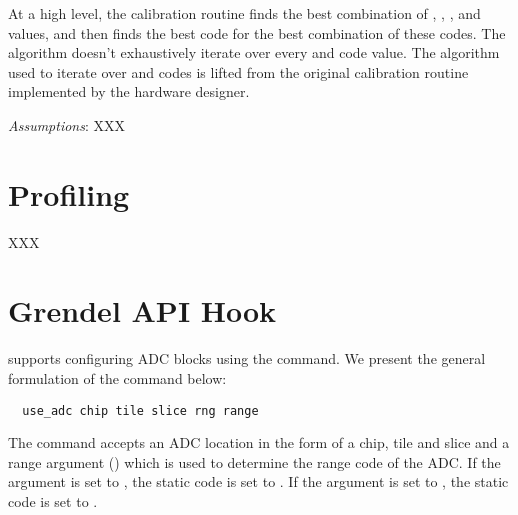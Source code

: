\begin{algorithmic}
        \EndFor
      \EndFor
    \EndFor
    \EndFor
    \EndFor
  \EndFor
  \State{}
  \EndFor
  \State{}
\end{algorithmic}

At a high level, the calibration routine finds the best combination of
, , ,  and  values, and
then finds the best  code for the best combination of these codes.
The algorithm doesn't exhaustively iterate over every  and 
code value. The algorithm used to iterate over  and  codes
is lifted from the original calibration routine implemented by the hardware
designer.

\noindent\textit{Assumptions}: XXX

\section{Profiling}

XXX

\section{Grendel API Hook}

\grendel supports configuring ADC blocks using the  command. We
present the general formulation of the  command below:

\begin{lstlisting}
  use_adc chip tile slice rng range
\end{lstlisting}

The  command accepts an ADC location in the form of a chip, tile and
slice and a range argument () which is used to determine the range
\static code of the ADC.  If the  argument is set to , the
 static code is set to . If the  argument is
set to , the  static code is set to .

